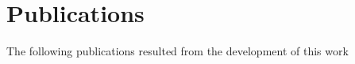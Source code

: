 \chapter*{Publications}
The following publications resulted from the development of this work

\begin{refsection}[ownpubs]
    \small
    \nocite{*} %
    \printbibliography[heading=none]
\end{refsection}
